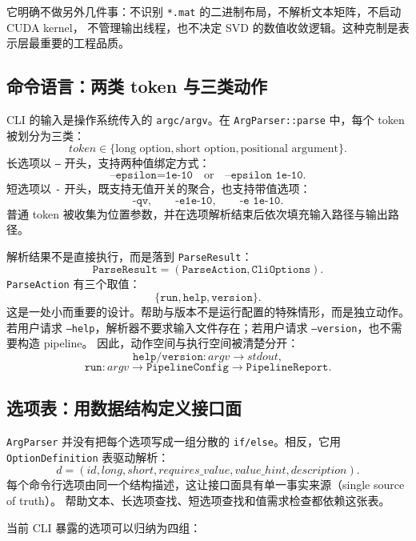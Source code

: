 它明确不做另外几件事：不识别 \texttt{*.mat} 的二进制布局，不解析文本矩阵，不启动 CUDA kernel，
不管理输出线程，也不决定 SVD 的数值收敛逻辑。这种克制是表示层最重要的工程品质。

\subsection{命令语言：两类 token 与三类动作}

CLI 的输入是操作系统传入的 \texttt{argc/argv}。在 \texttt{ArgParser::parse} 中，每个 token 被划分为三类：
\[
    token \in
    \{\text{long option},\text{short option},\text{positional argument}\}.
\]
长选项以 \texttt{--} 开头，支持两种值绑定方式：
\[
    \texttt{--epsilon=1e-10}
    \quad\text{or}\quad
    \texttt{--epsilon 1e-10}.
\]
短选项以 \texttt{-} 开头，既支持无值开关的聚合，也支持带值选项：
\[
    \texttt{-qv},\qquad
    \texttt{-e1e-10},\qquad
    \texttt{-e 1e-10}.
\]
普通 token 被收集为位置参数，并在选项解析结束后依次填充输入路径与输出路径。

解析结果不是直接执行，而是落到 \texttt{ParseResult}：
\[
    \texttt{ParseResult}
    =
    (\texttt{ParseAction},\texttt{CliOptions}).
\]
\texttt{ParseAction} 有三个取值：
\[
    \{\texttt{run},\texttt{help},\texttt{version}\}.
\]
这是一处小而重要的设计。帮助与版本不是运行配置的特殊情形，而是独立动作。若用户请求
\texttt{--help}，解析器不要求输入文件存在；若用户请求 \texttt{--version}，也不需要构造 pipeline。
因此，动作空间与执行空间被清楚分开：
\[
    \texttt{help/version}: argv \rightarrow stdout,
\]
\[
    \texttt{run}: argv \rightarrow \texttt{PipelineConfig} \rightarrow \texttt{PipelineReport}.
\]

\subsection{选项表：用数据结构定义接口面}

\texttt{ArgParser} 并没有把每个选项写成一组分散的 \texttt{if/else}。相反，它用
\texttt{OptionDefinition} 表驱动解析：
\[
    d=(id,long,short,requires\_value,value\_hint,description).
\]
每个命令行选项由同一个结构描述，这让接口面具有单一事实来源（single source of truth）。
帮助文本、长选项查找、短选项查找和值需求检查都依赖这张表。

当前 CLI 暴露的选项可以归纳为四组：

